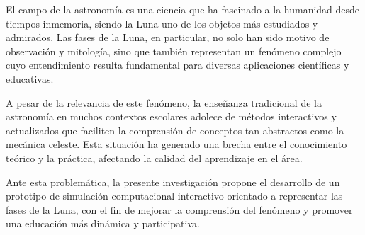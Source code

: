 El campo de la astronomía es una ciencia que ha fascinado a la humanidad desde tiempos inmemoria, 
siendo la Luna uno de los objetos más estudiados y admirados. Las fases de la Luna, en particular,
no solo han sido motivo de observación y mitología, sino que también representan un fenómeno complejo
 cuyo entendimiento resulta fundamental para diversas aplicaciones científicas y educativas.

A pesar de la relevancia de este fenómeno, la enseñanza tradicional de la astronomía en muchos contextos escolares
 adolece de métodos interactivos y actualizados que faciliten la comprensión de conceptos tan abstractos como la mecánica celeste. 
 Esta situación ha generado una brecha entre el conocimiento teórico y la práctica, afectando la calidad del aprendizaje en el área.

Ante esta problemática, la presente investigación propone el desarrollo de un prototipo de simulación computacional interactivo orientado 
a representar las fases de la Luna, con el fin de mejorar la comprensión del fenómeno y promover una educación más dinámica y participativa.